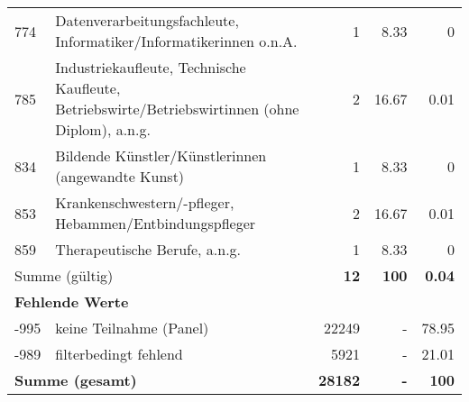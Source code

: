 \begin{longtable}{lXrrr}
     774 &
     \multicolumn{1}{X}{ Datenverarbeitungsfachleute, Informatiker/Informatikerinnen o.n.A.   } &


       \num{1} &
       \num[round-mode=places,round-precision=2]{8,33} &
         \num[round-mode=places,round-precision=2]{0} \\

     785 &
     \multicolumn{1}{X}{ Industriekaufleute, Technische Kaufleute, Betriebswirte/Betriebswirtinnen (ohne Diplom), a.n.g.   } &


       \num{2} &
       \num[round-mode=places,round-precision=2]{16,67} &
         \num[round-mode=places,round-precision=2]{0,01} \\

     834 &
     \multicolumn{1}{X}{ Bildende Künstler/Künstlerinnen (angewandte Kunst)   } &


       \num{1} &
       \num[round-mode=places,round-precision=2]{8,33} &
         \num[round-mode=places,round-precision=2]{0} \\

     853 &
     \multicolumn{1}{X}{ Krankenschwestern/-pfleger, Hebammen/Entbindungspfleger   } &


       \num{2} &
       \num[round-mode=places,round-precision=2]{16,67} &
         \num[round-mode=places,round-precision=2]{0,01} \\

     859 &
     \multicolumn{1}{X}{ Therapeutische Berufe, a.n.g.   } &


       \num{1} &
       \num[round-mode=places,round-precision=2]{8,33} &
         \num[round-mode=places,round-precision=2]{0} \\
     \midrule
     \multicolumn{2}{l}{Summe (gültig)} &
       \textbf{\num{12}} &
     \textbf{100} &
       \textbf{\num[round-mode=places,round-precision=2]{0,04}} \\
     \multicolumn{5}{l}{\textbf{Fehlende Werte}}\\
       -995 &
       keine Teilnahme (Panel) &
         \num{22249} &
        - &
         \num[round-mode=places,round-precision=2]{78,95} \\
       -989 &
       filterbedingt fehlend &
         \num{5921} &
        - &
         \num[round-mode=places,round-precision=2]{21,01} \\
     \midrule
     \multicolumn{2}{l}{\textbf{Summe (gesamt)}} &
          \textbf{\num{28182}} &
        \textbf{-} &
        \textbf{100} \\
     \bottomrule
     \end{longtable}
     
